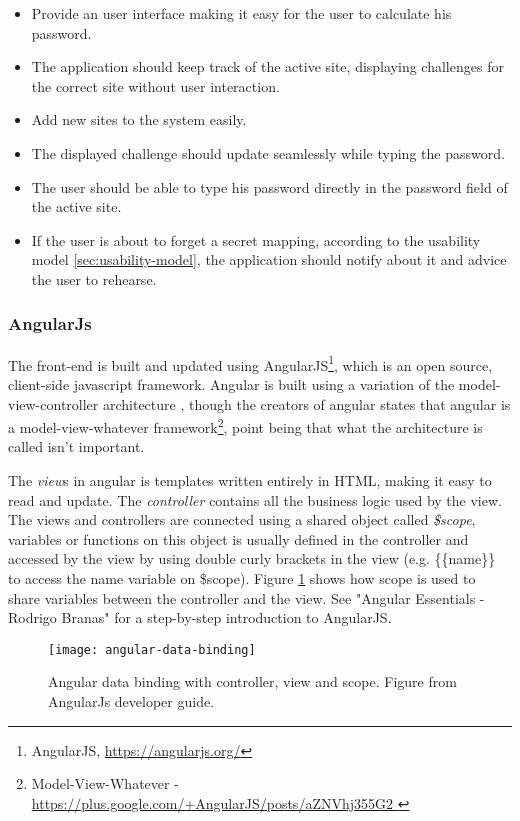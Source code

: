 \begin{itemize}
    \item Provide an user interface making it easy for the user to calculate his password.
    \item The application should keep track of the active site, displaying challenges for the correct site without user interaction.
    \item Add new sites to the system easily. 
    \item The displayed challenge should update seamlessly while typing the password.
    \item The user should be able to type his password directly in the password field of the active site.
    \item If the user is about to forget a secret mapping, according to the usability model \ref{sec:usability-model}, the application should notify about it and advice the user to rehearse.
\end{itemize}


\subsubsection{AngularJs}
The front-end is built and updated using AngularJS\footnote{AngularJS, \url{https://angularjs.org/}}, which is an open source, client-side javascript framework. Angular is built using a variation of the model-view-controller architecture \cite{mvc}, though the creators of angular states that angular is a model-view-whatever framework\footnote{Model-View-Whatever - \url{ https://plus.google.com/+AngularJS/posts/aZNVhj355G2 }}, point being that what the architecture is called isn't important. 
\par The \emph{view}s in angular is templates written entirely in HTML, making it easy to read and update. The \emph{controller} contains all the business logic used by the view. The views and controllers are connected using a shared object called \emph{\$scope}, variables or functions on this object is usually defined in the controller and accessed by the view by using double curly brackets in the view (e.g. \{\{name\}\} to access the name variable on \$scope). Figure \ref{angular-data-binding} shows how scope is used to share variables between the controller and the view. 
See "Angular Essentials - Rodrigo Branas"\cite{angularjs-book} for a step-by-step introduction to AngularJS.

\begin{figure}[h]
    \texttt{[image: angular-data-binding]} 
    \caption{Angular data binding with controller, view and scope. Figure from AngularJs developer guide.}
    \label{angular-data-binding}
\end{figure}


